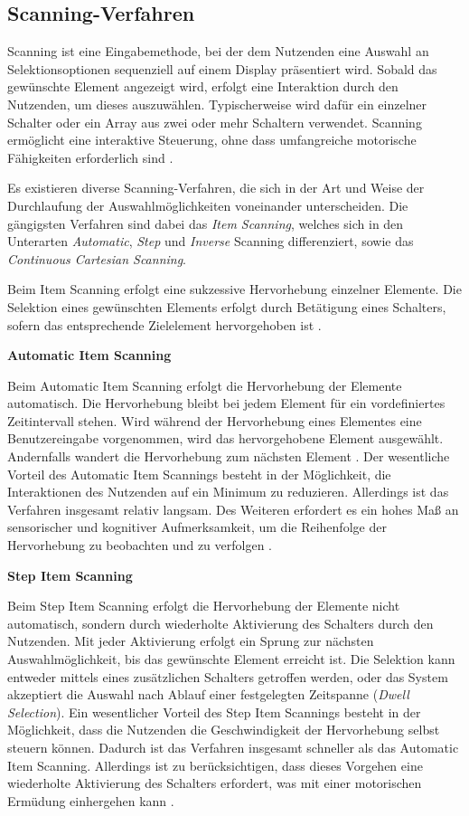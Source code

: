 \subsection{Scanning-Verfahren}
\label{subchap:Scanning}
Scanning ist eine Eingabemethode, bei der dem Nutzenden eine Auswahl an Selektionsoptionen sequenziell auf einem Display präsentiert wird. Sobald das gewünschte Element angezeigt wird, erfolgt eine Interaktion durch den Nutzenden, um dieses auszuwählen. Typischerweise wird dafür ein einzelner Schalter oder ein Array aus zwei oder mehr Schaltern verwendet. Scanning ermöglicht eine interaktive Steuerung, ohne dass umfangreiche motorische Fähigkeiten erforderlich sind \citep{COOK2015117}.

Es existieren diverse Scanning-Verfahren, die sich in der Art und Weise der Durchlaufung der Auswahlmöglichkeiten voneinander unterscheiden. Die gängigsten Verfahren sind dabei das \textit{Item Scanning}, welches sich in den Unterarten \textit{Automatic}, \textit{Step} und \textit{Inverse} Scanning differenziert, sowie das \textit{Continuous Cartesian Scanning}.

Beim Item Scanning erfolgt eine sukzessive Hervorhebung einzelner Elemente. Die Selektion eines gewünschten Elements erfolgt durch Betätigung eines Schalters, sofern das entsprechende Zielelement hervorgehoben ist \citep{10.1145/772047.772049}. 

{\normalfont \bfseries Automatic Item Scanning} 

Beim Automatic Item Scanning erfolgt die Hervorhebung der Elemente automatisch. Die Hervorhebung bleibt bei jedem Element für ein vordefiniertes Zeitintervall stehen. Wird während der Hervorhebung eines Elementes eine Benutzereingabe vorgenommen, wird das hervorgehobene Element ausgewählt. Andernfalls wandert die Hervorhebung zum nächsten Element \citep{10.1145/772047.772049}.
Der wesentliche Vorteil des Automatic Item Scannings besteht in der Möglichkeit, die Interaktionen des Nutzenden auf ein Minimum zu reduzieren. Allerdings ist das Verfahren insgesamt relativ langsam. Des Weiteren erfordert es ein hohes Maß an sensorischer und kognitiver Aufmerksamkeit, um die Reihenfolge der Hervorhebung zu beobachten und zu verfolgen \citep{COOK2015117}.

{\normalfont \bfseries Step Item Scanning} 

Beim Step Item Scanning erfolgt die Hervorhebung der Elemente nicht automatisch, sondern durch wiederholte Aktivierung des Schalters durch den Nutzenden. Mit jeder Aktivierung erfolgt ein Sprung zur nächsten Auswahlmöglichkeit, bis das gewünschte Element erreicht ist. Die Selektion kann entweder mittels eines zusätzlichen Schalters getroffen werden, oder das System akzeptiert die Auswahl nach Ablauf einer festgelegten Zeitspanne (\textit{Dwell Selection}). Ein wesentlicher Vorteil des Step Item Scannings besteht in der Möglichkeit, dass die Nutzenden die Geschwindigkeit der Hervorhebung selbst steuern können. Dadurch ist das Verfahren insgesamt schneller als das Automatic Item Scanning.  Allerdings ist zu berücksichtigen, dass dieses Vorgehen eine wiederholte Aktivierung des Schalters erfordert, was mit einer motorischen Ermüdung einhergehen kann \citep{COOK2015117}.

